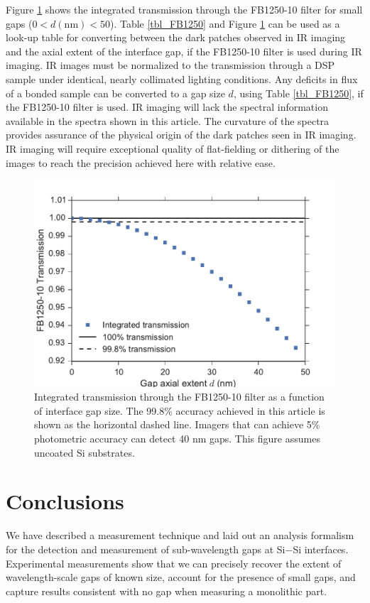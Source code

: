 \documentclass[osajnl,preprint,showpacs,superscriptaddress,12pt]{revtex4-1} %
\begin{document}
Figure \ref{figFB1250-10_integ} shows the integrated transmission through the FB1250-10 filter for small gaps ($0 < d(\mathrm{nm}) < 50$).  Table \ref{tbl_FB1250} and Figure \ref{figFB1250-10_integ} can be used as a look-up table for converting between the dark patches observed in IR imaging and the axial extent of the interface gap, if the FB1250-10 filter is used during IR imaging.  IR images must be normalized to the transmission through a DSP sample under identical, nearly collimated lighting conditions.  Any deficits in flux of a bonded sample can be converted to a gap size $d$, using Table \ref{tbl_FB1250}, if the FB1250-10 filter is used.  IR imaging will lack the spectral information available in the spectra shown in this article.  The curvature of the spectra provides assurance of the physical origin of the dark patches seen in IR imaging.  IR imaging will require exceptional quality of flat-fielding or dithering of the images to reach the precision achieved here with relative ease.  

\begin{figure}[htbp]
\includegraphics[width=0.8\columnwidth]{figs/FB1250-10_integ_trans.pdf}
\caption{\label{figFB1250-10_integ} Integrated transmission through the FB1250-10 filter as a function of interface gap size.  The 99.8\% accuracy achieved in this article is shown as the horizontal dashed line.  Imagers that can achieve 5\% photometric accuracy can detect 40 nm gaps.  This figure assumes uncoated Si substrates.}
\end{figure}

\section{Conclusions}
We have described a measurement technique and laid out an analysis formalism for the detection and measurement of sub-wavelength gaps at Si$-$Si interfaces.  Experimental measurements show that we can precisely recover the extent of wavelength-scale gaps of known size, account for the presence of small gaps, and capture results consistent with no gap when measuring a monolithic part.
\end{document}
